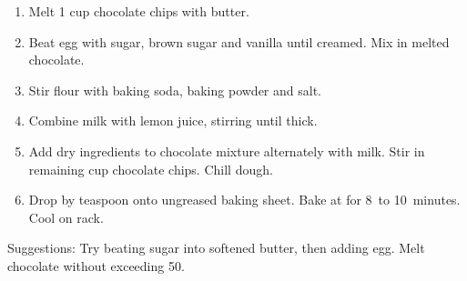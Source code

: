 
\begin{ingredients}
\end{ingredients}


\begin{recipe}
  \begin{enumerate}
  \item Melt 1 cup chocolate chips with butter.

  \item Beat egg with sugar, brown sugar and vanilla until creamed.
    Mix in melted chocolate.

  \item Stir flour with baking soda, baking powder and salt.

  \item Combine milk with lemon juice, stirring until thick.

  \item Add dry ingredients to chocolate mixture alternately with
    milk.  Stir in remaining cup chocolate chips.  Chill dough.

  \item Drop by teaspoon onto ungreased baking sheet.  Bake at
     for 8~to 10~minutes.  Cool on rack.
    
  \end{enumerate}

  Suggestions: Try beating sugar into softened butter, then adding
  egg.  Melt chocolate without exceeding 50\degreeC{}.
\end{recipe}
